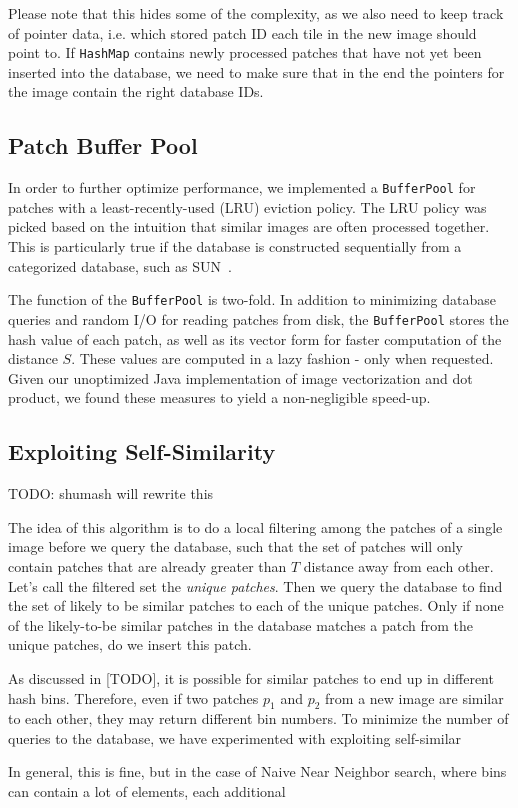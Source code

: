 Please note that this hides some of the complexity, as we also need to keep
track of pointer data, i.e. which stored patch ID each tile in the new image
should point to. If \texttt{HashMap} contains newly processed patches that have
not yet been inserted into the database, we need to make sure that in the end
the pointers for the image contain the right database IDs.

\subsection{Patch Buffer Pool}

In order to further optimize performance, we implemented a \texttt{Buffer{\allowbreak}Pool}
for patches with a least-recently-used (LRU) eviction policy. The LRU policy was picked
based on the intuition that similar images are often processed together.
This is particularly true if the database is constructed sequentially from a categorized
database, such as SUN~\cite{SUN}.

The function of the \texttt{Buffer{\allowbreak}Pool} is two-fold. In addition to
minimizing database queries and random I/O for reading patches from disk, the
\texttt{Buffer{\allowbreak}Pool} stores the hash value of each patch, as well as its
vector form for faster computation of the distance $S$.
These values are computed
in a lazy fashion - only when requested. Given our unoptimized Java
implementation of image vectorization and dot product,
we found these measures to yield a non-negligible speed-up.

\subsection{Exploiting Self-Similarity}

\begin{edit}
TODO: shumash will rewrite this

The idea of this algorithm is to do a local filtering among the patches of a single image before we query the database, such that the set of patches will only contain patches that are already greater than $T$ distance away from each other.  Let's call the filtered set the \emph{unique patches}. Then we query the database to find the set of likely to be similar patches to each of the unique patches. Only if none of the likely-to-be similar patches in the database matches a patch from the unique patches, do we insert this patch.

As discussed in [TODO], it is possible for similar patches to end up in
different hash bins. Therefore, even if two patches $p_1$ and $p_2$
from a new image are similar to each other, they may return
different bin numbers. To minimize the number of queries to the database,
we have experimented with exploiting self-similar


 In general,
this is fine, but in the case of Naive Near Neighbor search, where bins can
contain a lot of elements, each additional
\end{edit}
